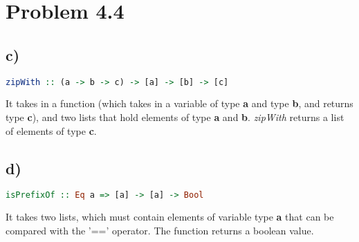 \documentclass{article}
\begin{document}
\section*{Problem 4.4}
\subsection*{c)}
\begin{lstlisting}[language=Haskell, caption=Haskell type of zipWith function]
    zipWith :: (a -> b -> c) -> [a] -> [b] -> [c]
\end{lstlisting}
It takes in a function (which takes in a variable of type \textbf{a} and type \textbf{b}, and returns type \textbf{c}),
and two lists that hold elements of type \textbf{a} and \textbf{b}. \textit{zipWith} returns a list of elements of type \textbf{c}.

\subsection*{d)}
\begin{lstlisting}[language=Haskell, caption=Haskell type of isPrefixOf function]
    isPrefixOf :: Eq a => [a] -> [a] -> Bool
\end{lstlisting}
It takes two lists, which must contain elements of variable type \textbf{a} that can be compared with the '==' operator.
The function returns a boolean value.
\end{document}
